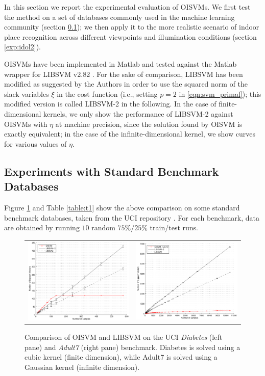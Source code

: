 In this section we report the experimental evaluation of OISVMs. We
first test the method on a set of databases commonly used in the
machine learning community (section \ref{exp:ml}); we then apply it to
the more realistic scenario of indoor place recognition across
different viewpoints and illumination conditions (section
\ref{exp:idol2}).

OISVMs have been implemented in Matlab and tested against the Matlab
wrapper for LIBSVM v2.82 \cite{ChangL01}. For the sake of comparison,
LIBSVM has been modified as suggested by the Authors in order to use
the squared norm of the slack variables $\xi$ in the cost function
(i.e., setting $p=2$ in \ref{eqn:svm_primal}); this modified version
is called LIBSVM-2 in the following. In the case of finite-dimensional
kernels, we only show the performance of LIBSVM-2 against OISVMs with
$\eta$ at machine precision, since the solution found by OISVM is
exactly equivalent; in the case of the infinite-dimensional kernel, we
show curves for various values of $\eta$.

\subsection{Experiments with Standard Benchmark Databases}
\label{exp:ml}

Figure \ref{fig:ad7} and Table \ref{table:t1} show the above
comparison on some standard benchmark databases, taken from the UCI
repository \cite{Newman+Hettich+Blake+Merz:1998}. For each benchmark,
data are obtained by running $10$ random $75\%/25\%$ train/test runs.

\begin{figure}[!ht]
  \centering \footnotesize
  \begin{tabular}{cc}
  \includegraphics[width=0.47\linewidth]{figs/results/finite_kernel.pdf} &
  \includegraphics[width=0.47\linewidth]{figs/results/adult7.pdf}
  \end{tabular}
  \caption{Comparison of OISVM and LIBSVM on the UCI \emph{Diabetes}
  (left pane) and \emph{Adult7} (right pane) benchmark. Diabetes is
  solved using a cubic kernel (finite dimension), while Adult7 is
  solved using a Gaussian kernel (infinite dimension).}
\label{fig:ad7}
\end{figure}

